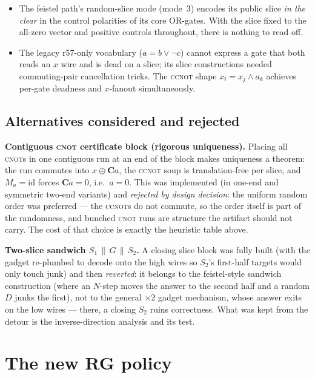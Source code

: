 \documentclass[11pt]{article}
\newcommand{\CNOT}{\textsc{cnot}}
\newcommand{\CCNOT}{\textsc{ccnot}}
\newcommand{\Sone}{S_1}
\begin{document}
\begin{itemize}
\item The feistel path's random-slice mode (mode~3) encodes its public slice
\emph{in the clear} in the control polarities of its core OR-gates. With the
slice fixed to the all-zero vector and positive controls throughout, there
is nothing to read off.
\item The legacy r57-only vocabulary ($a \mathrel{\hat{}}= b \lor \lnot c$)
cannot express a gate that both reads an $x$ wire and is dead on a slice;
its slice constructions needed commuting-pair cancellation tricks. The
\CCNOT{} shape $x_i \mathrel{\hat{}}= x_j \wedge a_k$ achieves per-gate
deadness and $x$-fanout simultaneously.
\end{itemize}

\subsection{Alternatives considered and rejected}
\label{sec:rejected}

\textbf{Contiguous \CNOT{} certificate block (rigorous uniqueness).} Placing
all \CNOT{}s in one contiguous run at an end of the block makes uniqueness a
theorem: the run commutes into $x \oplus \mathbf{C}a$, the \CCNOT{} soup is
translation-free per slice, and $M_a = \mathrm{id}$ forces
$\mathbf{C}a = 0$, i.e.\ $a=0$. This was implemented (in one-end and
symmetric two-end variants) and \emph{rejected by design decision}: the
uniform random order was preferred --- the \CCNOT{}s do not commute, so the
order itself is part of the randomness, and bunched \CNOT{} runs are
structure the artifact should not carry. The cost of that choice is exactly
the heuristic table above.

\textbf{Two-slice sandwich $\Sone \,\|\, G \,\|\, S_2$.} A closing slice
block was fully built (with the gadget re-plumbed to decode onto the high
wires so $S_2$'s first-half targets would only touch junk) and then
\emph{reverted}: it belongs to the feistel-style sandwich construction
(where an $N$-step moves the answer to the second half and a random $D$
junks the first), not to the general $\times 2$ gadget mechanism, whose
answer exits on the low wires --- there, a closing $S_2$ ruins correctness.
What was kept from the detour is the inverse-direction analysis and its
test.

\section{The new RG policy}
\label{sec:rg}
\end{document}
